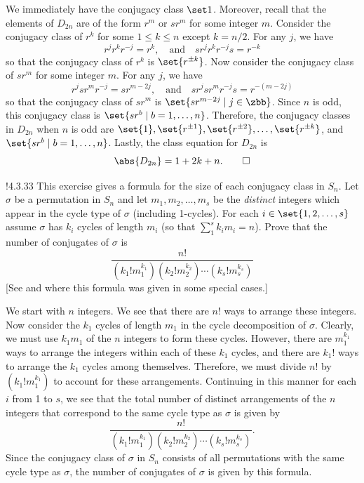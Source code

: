 \begin{sol}
	We immediately have the conjugacy class $\set 1$.
	Moreover, recall that the elements of $D_{2n}$ are of the form $r^m$ or $sr^m$ for some integer $m$.
	Consider the conjugacy class of $r^k$ for some $1 \leq k \leq n$ except $k = n/2$.
	For any $j$, we have
	\[
		r^jr^kr^{-j} = r^k, \quad \text{and} \quad sr^jr^kr^{-j}s = r^{-k}
	\]
	so that the conjugacy class of $r^k$ is $\set{r^{\pm k}}$.
	Now consider the conjugacy class of $sr^m$ for some integer $m$.
	For any $j$, we have
	\[
		r^jsr^mr^{-j} = sr^{m - 2j}, \quad \text{and} \quad sr^jsr^mr^{-j}s = r^{-(m - 2j)}
	\]
	so that the conjugacy class of $sr^m$ is $\set{sr^{m - 2j} \mid j \in \zbb}$.
	Since $n$ is odd, this conjugacy class is $\set{sr^b \mid b = 1, \ldots, n}$.
	Therefore, the conjugacy classes in $D_{2n}$ when $n$ is odd are $\set{1}, \set{r^{\pm 1}}, \set{r^{\pm 2}}, \ldots, \set{r^{\pm k}}$, and $\set{sr^b \mid b = 1, \ldots, n}$.
	Lastly, the class equation for $D_{2n}$ is
	\[
		\abs{D_{2n}} = 1 + 2k + n.\qedhere
	\]
\end{sol}

\begin{exercise}!{4.3.33}
	This exercise gives a formula for the size of each conjugacy class in $S_n$.
	Let $\sigma$ be a permutation in $S_n$ and let $m_1, m_2, \ldots, m_s$ be the \emph{distinct} integers which appear in the cycle type of $\sigma$ (including 1-cycles).
	For each $i \in \set{1, 2, \ldots, s}$ assume $\sigma$ has $k_i$ cycles of length $m_i$ (so that $\sum_1^s k_im_i = n$).
	Prove that the number of conjugates of $\sigma$ is
	\[
		\frac{n!}{(k_1!m_1^{k_1})(k_2!m_2^{k_2}) \cdots (k_s!m_s^{k_s})}
	\]
	[See  and  where this formula was given in some special cases.]
\end{exercise}

\begin{sol}
	We start with $n$ integers.
	We see that there are $n!$ ways to arrange these integers.
	Now consider the $k_1$ cycles of length $m_1$ in the cycle decomposition of $\sigma$.
	Clearly, we must use $k_1m_1$ of the $n$ integers to form these cycles.
	However, there are $m_1^{k_1}$ ways to arrange the integers within each of these $k_1$ cycles, and there are $k_1!$ ways to arrange the $k_1$ cycles among themselves.
	Therefore, we must divide $n!$ by $(k_1!m_1^{k_1})$ to account for these arrangements.
	Continuing in this manner for each $i$ from 1 to $s$, we see that the total number of distinct arrangements of the $n$ integers that correspond to the same cycle type as $\sigma$ is given by
	\[
		\frac{n!}{(k_1!m_1^{k_1})(k_2!m_2^{k_2}) \cdots (k_s!m_s^{k_s})}.
	\]
	Since the conjugacy class of $\sigma$ in $S_n$ consists of all permutations with the same cycle type as $\sigma$, the number of conjugates of $\sigma$ is given by this formula.
\end{sol}

